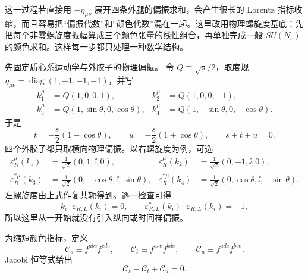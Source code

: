 \begin{derivation}[胶子散射的颜色与偏振求和]
这一过程若直接用 $-\eta_{\mu\nu}$ 展开四条外腿的偏振求和，会产生很长的 Lorentz 指标收缩，而且容易把“偏振代数”和“颜色代数”混在一起。这里改用物理螺旋度基底：先把每个非零螺旋度振幅算成三个颜色张量的线性组合，再单独完成一般 $SU(N_c)$ 的颜色求和。这样每一步都只处理一种数学结构。

先固定质心系运动学与外胶子的物理偏振。
令 $Q\equiv\sqrt{s}/2$，取度规 $\eta_{\mu\nu}=\operatorname{diag}(1,-1,-1,-1)$，并写
\begin{align*}
 k_1^\mu&=Q(1,0,0,1),&
 k_2^\mu&=Q(1,0,0,-1),\\
 k_3^\mu&=Q(1,\sin\theta,0,\cos\theta),&
 k_4^\mu&=Q(1,-\sin\theta,0,-\cos\theta).
\end{align*}
于是
\begin{equation*}
 t=-\frac{s}{2}(1-\cos\theta),
 \qquad
 u=-\frac{s}{2}(1+\cos\theta),
 \qquad s+t+u=0.
\end{equation*}
四个外胶子都只取横向物理偏振。以右螺旋度为例，可选
\begin{align*}
 \varepsilon_R^\mu(k_1)&=\frac1{\sqrt2}(0,1,\ii,0),&
 \varepsilon_R^\mu(k_2)&=\frac1{\sqrt2}(0,-1,\ii,0),\\
 \varepsilon_R^{*\mu}(k_3)&=\frac1{\sqrt2}(0,-\cos\theta,\ii,\sin\theta),&
 \varepsilon_R^{*\mu}(k_4)&=\frac1{\sqrt2}(0,\cos\theta,\ii,-\sin\theta).
\end{align*}
左螺旋度由上式作复共轭得到。逐一检查可得
\begin{equation*}
 k_i\cdot\varepsilon_{R,L}(k_i)=0,
 \qquad
 \varepsilon_{R,L}^*(k_i)\cdot\varepsilon_{R,L}(k_i)=-1,
\end{equation*}
所以这里从一开始就没有引入纵向或时间样偏振。

为缩短颜色指标，定义
\begin{equation*}
 \mathcal C_s\equiv f^{abe}f^{cde},
 \qquad
 \mathcal C_t\equiv f^{ace}f^{bde},
 \qquad
 \mathcal C_u\equiv f^{ade}f^{bce}.
\end{equation*}
Jacobi 恒等式给出
\begin{equation*}
 \mathcal C_s-\mathcal C_t+\mathcal C_u=0.
\end{equation*}


\end{derivation}
